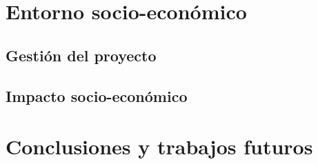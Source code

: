 \documentclass[12pt]{report} %
\begin{document}
\chapter{Entorno socio-económico}

\section{Gestión del proyecto}



\section{Impacto socio-económico}



\chapter{Conclusiones y trabajos futuros}




\clearpage
{}
\printbibliography




\end{document}
